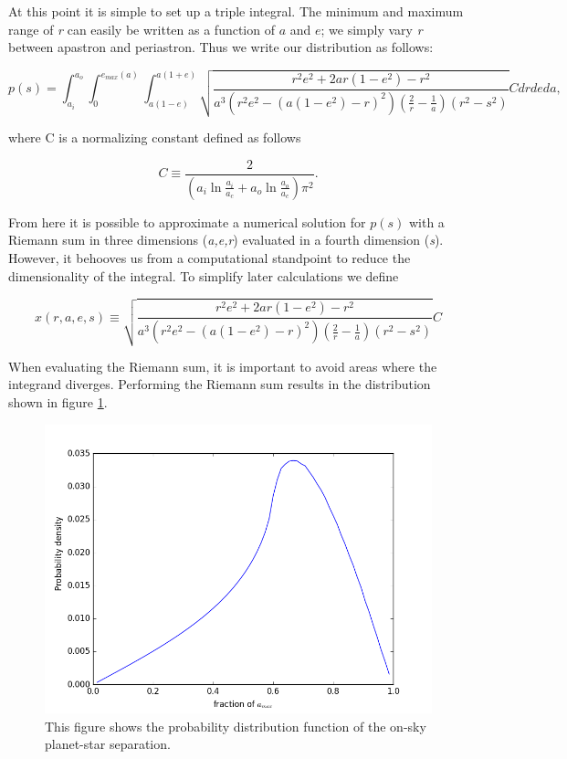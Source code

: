 \documentclass{article}
\begin{document}
	At this point it is simple to set up a triple integral. The minimum and maximum range of \textit{r} can easily be written as a function of $a$ and $e$; we simply vary \textit{r} between apastron and periastron. Thus we write our distribution as follows:
	
	\begin{equation}
	p(s) = \int^{a_{o}}_{a_{i}} \int^{e_{max}(a)}_{0} \int^{a(1+e)}_{a(1-e)} \sqrt{\frac{r^2e^2 +2ar(1-e^2) - r^2}{a^{3}(r^2e^2 - (a(1-e^2) - r)^2)\left( \frac{2}{r} - \frac{1}{a} \right)(r^2 - s^2)}} C dr de da,
	\end{equation}
	
where C is a normalizing constant defined as follows
	
	\begin{equation}
	C \equiv \frac{2}{(a_{i}\ln{\frac{a_{i}}{a_{c}}} + a_{o}\ln{\frac{a_{o}}{a_{c}}})\pi^2}.
	\end{equation}
	
	From here it is possible to approximate a numerical solution for $p(s)$ with a  Riemann sum in three dimensions (\textit{a,e,r}) evaluated in a fourth dimension (\textit{s}). However, it behooves us from a computational standpoint to reduce the dimensionality of the integral. To simplify later calculations we define
	
	\begin{equation*}
	x(r,a,e,s) \equiv \sqrt{\frac{r^2e^2 +2ar(1-e^2) - r^2}{a^{3}(r^2e^2 - (a(1-e^2) - r)^2)\left( \frac{2}{r} - \frac{1}{a} \right)(r^2 - s^2)}} C
	\end{equation*}
	
	When evaluating the Riemann sum, it is important to avoid areas where the integrand diverges. Performing the Riemann sum results in the distribution shown in figure \ref{fig:p_s}.
	
	\begin{figure}
		\includegraphics[width = \linewidth]{p_s_correct2.png}
		\caption{This figure shows the probability distribution function of the on-sky planet-star separation. }
		\label{fig:p_s}
	\end{figure}
	
\end{document}
